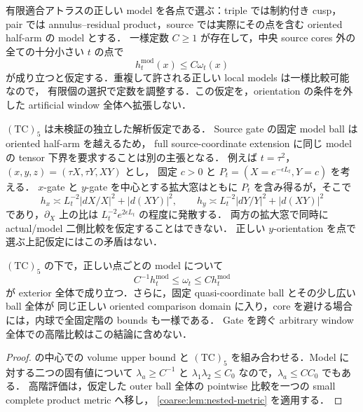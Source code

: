 \documentclass[a4paper,11pt]{ltjsarticle}
\numberwithin{equation}{section}
\theoremstyle{plain}
\theoremstyle{definition}
\theoremstyle{remark}
\begin{document}
\begin{hypothesis}\label{coarse:hyp:TC5}
有限適合アトラスの正しい model を各点で選ぶ：triple では制約付き cusp，
pair では annulus--residual product，source では実際にその点を含む oriented half-arm の model とする．
一様定数 $C\ge1$ が存在して，中央 source cores 外の全ての十分小さい $t$ の点で
\begin{equation}\label{coarse:eq:TC5}
 h^{\mathrm{mod}}_t(x)\le C\omega_t(x)
\end{equation}
が成り立つと仮定する．重複して許される正しい local models は一様比較可能なので，
有限個の選択で定数を調整する．この仮定を，orientation の条件を外した artificial window 全体へ拡張しない．
\end{hypothesis}

\begin{remark}
$\mathrm{(TC)}_5$ は未検証の独立した解析仮定である．
Source gate の固定 model ball は oriented half-arm を越えるため，
full source-coordinate extension に同じ model の tensor 下界を要求することは別の主張となる．
例えば $t=\tau^2$，$(x,y,z)=(\tau X,\tau Y,XY)$ とし，
固定 $c>0$ と $P_t=(X=e^{-\epsilon L_t},Y=c)$ を考える．
$x$-gate と $y$-gate を中心とする拡大窓はともに $P_t$ を含み得るが，そこで
\[
 h_x\asymp L_t^{-2}|dX/X|^2+|d(XY)|^2,\qquad
 h_y\asymp L_t^{-2}|dY/Y|^2+|d(XY)|^2
\]
であり，$\partial_X$ 上の比は $L_t^{-2}e^{2\epsilon L_t}$ の程度に発散する．
両方の拡大窓で同時に actual/model 二側比較を仮定することはできない．
正しい $y$-orientation を点で選ぶ上記仮定にはこの矛盾はない．
\end{remark}

\begin{corollary}\label{coarse:cor:exterior-comparison}
$\mathrm{(TC)}_5$ の下で，正しい点ごとの model について
\[
 C^{-1}h_t^{\mathrm{mod}}\le\omega_t\le C h_t^{\mathrm{mod}}
\]
が exterior 全体で成り立つ．さらに，固定 quasi-coordinate ball とその少し広い ball 全体が
同じ正しい oriented comparison domain に入り，core を避ける場合には，内球で全固定階の bounds も一様である．
Gate を跨ぐ arbitrary window 全体での高階比較はこの結論に含めない．
\end{corollary}

\begin{proof}
 の中心での volume upper bound と
$\mathrm{(TC)}_5$ を組み合わせる．Model に対する二つの固有値について
$\lambda_a\ge C^{-1}$ と $\lambda_1\lambda_2\le C_0$ なので，$\lambda_a\le C C_0$ でもある．
高階評価は，仮定した outer ball 全体の pointwise 比較を一つの small complete product metric へ移し，
\cref{coarse:lem:nested-metric} を適用する．
\end{proof}
\end{document}
